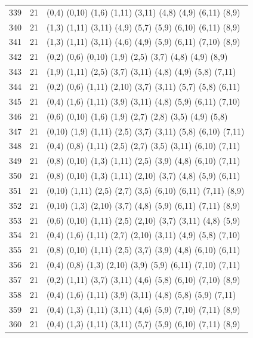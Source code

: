 \begin{appendix}
{\begin{longtable}{lll}
339& 21 & (0,4)   (0,10) (1,6)  (1,11)  (3,11)  (4,8)   (4,9)   (6,11)  (8,9)\\
340& 21 & (1,3)   (1,11) (3,11) (4,9)   (5,7)   (5,9)   (6,10)  (6,11)  (8,9)\\
341& 21 & (1,3)   (1,11) (3,11) (4,6)   (4,9)   (5,9)   (6,11)  (7,10)  (8,9)\\
342& 21 & (0,2)   (0,6)  (0,10) (1,9)   (2,5)   (3,7)   (4,8)   (4,9)   (8,9)\\
343& 21 & (1,9)   (1,11) (2,5)  (3,7)   (3,11)  (4,8)   (4,9)   (5,8)   (7,11)\\
344& 21 & (0,2)   (0,6)  (1,11) (2,10)  (3,7)   (3,11)  (5,7)   (5,8)   (6,11)\\
345& 21 & (0,4)   (1,6)  (1,11) (3,9)   (3,11)  (4,8)   (5,9)   (6,11)  (7,10)\\
346& 21 & (0,6)   (0,10) (1,6)  (1,9)   (2,7)   (2,8)   (3,5)   (4,9)   (5,8)\\
347& 21 & (0,10)  (1,9)  (1,11) (2,5)   (3,7)   (3,11)  (5,8)   (6,10)  (7,11)\\
348& 21 & (0,4)   (0,8)  (1,11) (2,5)   (2,7)   (3,5)   (3,11)  (6,10)  (7,11)\\
349& 21 & (0,8)   (0,10) (1,3)  (1,11)  (2,5)   (3,9)   (4,8)   (6,10)  (7,11)\\
350& 21 & (0,8)   (0,10) (1,3)  (1,11)  (2,10)  (3,7)   (4,8)   (5,9)   (6,11)\\
351& 21 & (0,10)  (1,11) (2,5)  (2,7)   (3,5)   (6,10)  (6,11)  (7,11)  (8,9)\\
352& 21 & (0,10)  (1,3)  (2,10) (3,7)   (4,8)   (5,9)   (6,11)  (7,11)  (8,9)\\
353& 21 & (0,6)   (0,10) (1,11) (2,5)   (2,10)  (3,7)   (3,11)  (4,8)   (5,9)\\
354& 21 & (0,4)   (1,6)  (1,11) (2,7)   (2,10)  (3,11)  (4,9)   (5,8)   (7,10)\\
355& 21 & (0,8)   (0,10) (1,11) (2,5)   (3,7)   (3,9)   (4,8)   (6,10)  (6,11)\\
356& 21 & (0,4)   (0,8)  (1,3)  (2,10)  (3,9)   (5,9)   (6,11)  (7,10)  (7,11)\\
357& 21 & (0,2)   (1,11) (3,7)  (3,11)  (4,6)   (5,8)   (6,10)  (7,10)  (8,9)\\
358& 21 & (0,4)   (1,6)  (1,11) (3,9)   (3,11)  (4,8)   (5,8)   (5,9)   (7,11)\\
359& 21 & (0,4)   (1,3)  (1,11) (3,11)  (4,6)   (5,9)   (7,10)  (7,11)  (8,9)\\
360& 21 & (0,4)   (1,3)  (1,11) (3,11)  (5,7)   (5,9)   (6,10)  (7,11)  (8,9)\\

\end{longtable}}
\end{appendix}
